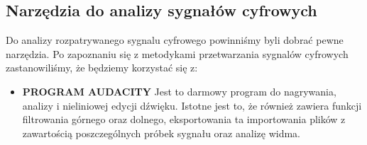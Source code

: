 \documentclass[a4paper,titleauthor]{mwart}
\begin{document}
\subsection{Narzędzia do analizy sygnałów cyfrowych}

Do analizy rozpatrywanego sygnalu cyfrowego powinniśmy byli dobrać pewne narzędzia. Po zapoznaniu się z metodykami przetwarzania sygnalów cyfrowych zastanowiliśmy, że będziemy korzystać się z:

\begin{itemize}
	\item \textbf{PROGRAM AUDACITY} \newline\newline
	Jest to darmowy program do nagrywania, analizy i nieliniowej edycji dźwięku. Istotne jest to, że również zawiera funkcji filtrowania górnego oraz dolnego, eksportowania ta importowania plików z zawartością poszczególnych próbek sygnału oraz analizę widma.\newline
	

\end{itemize}
\end{document}
